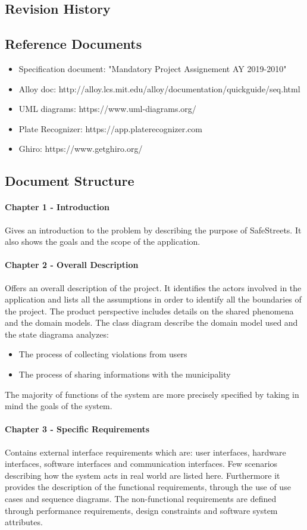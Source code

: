 \documentclass{article}
\begin{document}
\subsection{Revision History}
\subsection{Reference Documents}
\begin{itemize}
    \item Specification document: "Mandatory Project Assignement AY 2019-2010"
    \item Alloy doc: http://alloy.lcs.mit.edu/alloy/documentation/quickguide/seq.html
    \item UML diagrams: https://www.uml-diagrams.org/
    \item Plate Recognizer: https://app.platerecognizer.com
    \item Ghiro: https://www.getghiro.org/
\end{itemize}
\newpage
\subsection{Document Structure}
\paragraph{Chapter 1 - Introduction}
Gives an introduction to the problem by describing the purpose of SafeStreets.
It also shows the goals and the scope of the application. \paragraph{Chapter 2 -
Overall Description}Offers an overall description of the project. It identifies
the actors involved in the application and lists all the assumptions in order to
identify all the boundaries of the project. The product perspective includes
details on the shared phenomena and the domain models. The class diagram
describe the domain model used and the state diagrama analyzes:
\begin{itemize}
    \item The process of collecting violations from users
    \item The process of sharing informations with the municipality
\end{itemize}
The majority of functions of the system are more precisely specified by taking
in mind the goals of the system.  
\paragraph{Chapter 3 - Specific Requirements}
Contains external interface requirements which are: user interfaces, hardware
interfaces, software interfaces and communication interfaces. Few scenarios
describing how the system acts in real world are listed here. Furthermore it
provides the description of the functional requirements, through the use of use
cases and sequence diagrams. The non-functional requirements are defined through
performance requirements, design constraints and software system attributes.
\end{document}
